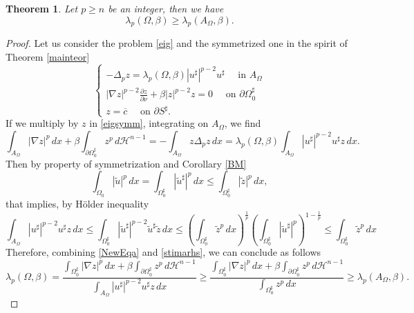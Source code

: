 \documentclass[12pt]{article}
\newcommand{\abs}[1]{{\left|#1\right|}}
\newcommand{\dH}{d\mathcal{H}^{n-1}}
\theoremstyle{definition}
\theoremstyle{plain}
\newtheorem{teorema}{Theorem}[section]
\theoremstyle{definition}
\begin{document}
\begin{teorema}
    Let $p\geq n$ be an integer, then we have
    \begin{equation*}
        \lambda_{p}(\Omega,\beta)\geq\lambda_{p}(A_\Omega,\beta).
    \end{equation*}
\end{teorema}
\begin{proof}
    Let us consider the problem \eqref{eig} and the symmetrized one in the spirit of Theorem \ref{mainteor}
    \begin{equation}\label{eigsymm}
        \begin{cases}
            -\Delta_pz=\lambda_{p}(\Omega,\beta)\abs{u^\sharp}^{p-2}u^\sharp\quad\text{ in }A_\Omega \\
            \abs{\nabla z}^{p-2}\frac{\partial z}{\partial\nu}+\beta\abs{z}^{p-2} z=0\quad\text{ on }\partial\Omega_0^\sharp\\
            z=\overline c \quad\text{ on }\partial S^\sharp.
        \end{cases}
    \end{equation}
    If we multiply by $z$ in \eqref{eigsymm}, integrating on $A_\Omega$, we find
    \begin{equation}\label{NewEqa}
        \int_{A_\Omega}\abs{\nabla z}^p\,dx+\beta\int_{\partial \Omega_0^\sharp}z^p\,\dH=-\int_{A_\Omega}z\Delta_p z\,dx=\lambda_p(\Omega,\beta)\int_{A_\Omega}\abs{u^\sharp}^{p-2}u^\sharp z\,dx.
    \end{equation}
    Then by property of symmetrization and Corollary \ref{BM}
    \[\int_{\Omega_0}\abs{\tilde u}^p\,dx=\int_{\Omega_0^\sharp}\abs{\tilde u^\sharp}^p\,dx\leq\int_{\Omega_0^\sharp}\abs{\tilde z}^p\,dx,\]
    that implies, by H\"older inequality
    \begin{equation}\label{stimarhs}
        \int_{A_\Omega}\abs{ u^\sharp}^{p-2} u^\sharp z\,dx\leq\int_{\Omega^\sharp_0}\abs{\tilde u^\sharp}^{p-2}\tilde u^\sharp \tilde z\,dx\leq\left(\int_{\Omega^\sharp_0} 
        \tilde z^p\,dx\right)^\frac{1}{p}\left(\int_{\Omega^\sharp_0}\abs{\tilde u^\sharp}^p\right)^{1-\frac{1}{p}}\leq\int_{\Omega^\sharp_0} 
        \tilde z^p\,dx
    \end{equation}
    Therefore, combining \eqref{NewEqa} and \eqref{stimarhs}, we can conclude as follows
    \begin{equation*}
            \lambda_{p}(\Omega,\beta)=\frac{\int_{\Omega_0^\sharp}\abs{\nabla z}^p\,dx+\beta\int_{\partial\Omega_0^\sharp}z^p\,\dH}{\int_{A_\Omega}\abs{ u^\sharp}^{p-2} u^\sharp z\,dx}\geq\frac{\int_{\Omega_0^\sharp}\abs{\nabla z}^p\,dx+\beta\int_{\partial\Omega_0^\sharp}z^p\,\dH}{\int_{\Omega_0^\sharp} z^p\,dx}\geq\lambda_{p}(A_\Omega,\beta).
    \end{equation*}
\end{proof}
\end{document}
